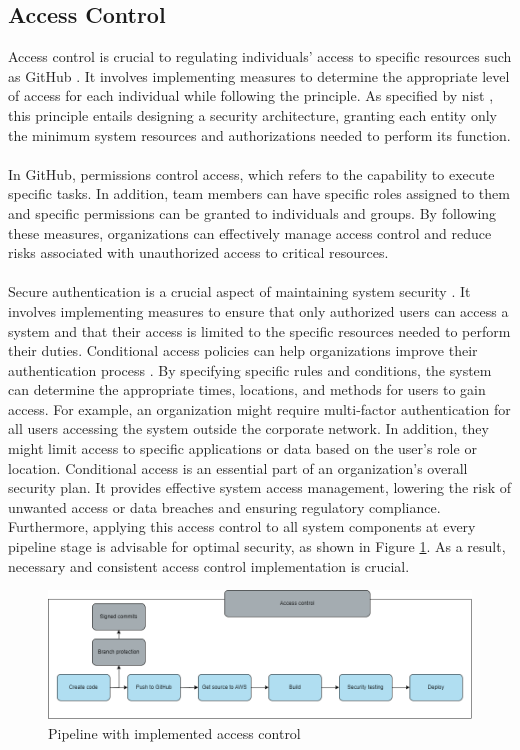 \subsection{Access Control}
Access control is crucial to regulating individuals' access to specific resources such as GitHub \cite{accesscontroll}. It involves implementing measures to determine the appropriate level of access for each individual while following the  principle. As specified by \acrshort{nist} \cite{leastprivilege}, this principle entails designing a security architecture, granting each entity only the minimum system resources and authorizations needed to perform its function. 
\\~\\
In GitHub, permissions control access, which refers to the capability to execute specific tasks. In addition, team members can have specific roles assigned to them and specific permissions can be granted to individuals and groups. By following these measures, organizations can effectively manage access control and reduce risks associated with unauthorized access to critical resources. 
\\~\\
Secure authentication is a crucial aspect of maintaining system security \cite{iso27002}. It involves implementing measures to ensure that only authorized users can access a system and that their access is limited to the specific resources needed to perform their duties. Conditional access policies can help organizations improve their authentication process \cite{conditionalaccess}. By specifying specific rules and conditions, the system can determine the appropriate times, locations, and methods for users to gain access. For example, an organization might require multi-factor authentication for all users accessing the system outside the corporate network. In addition, they might limit access to specific applications or data based on the user's role or location.
\newpage
Conditional access is an essential part of an organization's overall security plan. It provides effective system access management, lowering the risk of unwanted access or data breaches and ensuring regulatory compliance. Furthermore, applying this access control to all system components at every pipeline stage is advisable for optimal security, as shown in Figure \ref{fig: Pipeline with implemented access control}. As a result, necessary and consistent access control implementation is crucial.

\vspace{2mm}
\begin{figure}[H]
    \centering
    \includegraphics[width=0.8\columnwidth]{Images/accesscontrol.png}
    \caption{Pipeline with implemented access control}
    \label{fig: Pipeline with implemented access control}
\end{figure}

